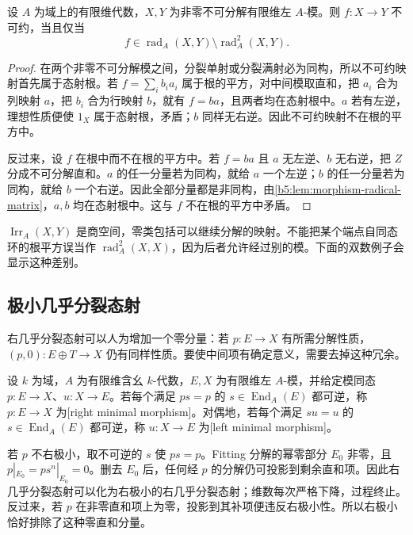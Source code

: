 \begin{proposition}\label{b5:prop:irreducible-radical}
	设 \(A\) 为域上的有限维代数，\(X,Y\) 为非零不可分解有限维左 \(A\)-模。则 \(f:X\to Y\) 不可约，当且仅当
	\[
		f\in\operatorname{rad}_A(X,Y)\setminus\operatorname{rad}_A^2(X,Y).
	\]
\end{proposition}
\begin{proof}
	在两个非零不可分解模之间，分裂单射或分裂满射必为同构，所以不可约映射首先属于态射根。若 \(f=\sum_i b_i a_i\) 属于根的平方，对中间模取直和，把 \(a_i\) 合为列映射 \(a\)，把 \(b_i\) 合为行映射 \(b\)，就有 \(f=ba\)，且两者均在态射根中。\(a\) 若有左逆，理想性质便使 \(1_X\) 属于态射根，矛盾；\(b\) 同样无右逆。因此不可约映射不在根的平方中。

	反过来，设 \(f\) 在根中而不在根的平方中。若 \(f=ba\) 且 \(a\) 无左逆、\(b\) 无右逆，把 \(Z\) 分成不可分解直和。\(a\) 的任一分量若为同构，就给 \(a\) 一个左逆；\(b\) 的任一分量若为同构，就给 \(b\) 一个右逆。因此全部分量都是非同构，由\cref{b5:lem:morphism-radical-matrix}，\(a,b\) 均在态射根中。这与 \(f\) 不在根的平方中矛盾。
\end{proof}

\(\operatorname{Irr}_A(X,Y)\) 是商空间，零类包括可以继续分解的映射。不能把某个端点自同态环的根平方误当作 \(\operatorname{rad}_A^2(X,X)\)，因为后者允许经过别的模。下面的双数例子会显示这种差别。

\subsection{极小几乎分裂态射}
\label{b5:subsec:1005:02}

右几乎分裂态射可以人为增加一个零分量：若 \(p:E\to X\) 有所需分解性质，\((p,0):E\oplus T\to X\) 仍有同样性质。要使中间项有确定意义，需要去掉这种冗余。

\begin{definition}\label{b5:def:minimal-morphism}
	设 \(k\) 为域，\(A\) 为有限维含幺 \(k\)-代数，\(E,X\) 为有限维左 \(A\)-模，并给定模同态 \(p:E\to X\)、\(u:X\to E\)。若每个满足 \(ps=p\) 的 \(s\in\operatorname{End}_A(E)\) 都可逆，称 \(p:E\to X\) 为[right minimal morphism]。对偶地，若每个满足 \(su=u\) 的 \(s\in\operatorname{End}_A(E)\) 都可逆，称 \(u:X\to E\) 为[left minimal morphism]。
\end{definition}

若 \(p\) 不右极小，取不可逆的 \(s\) 使 \(ps=p\)。Fitting 分解的幂零部分 \(E_0\) 非零，且 \(p|_{E_0}=ps^n|_{E_0}=0\)。删去 \(E_0\) 后，任何经 \(p\) 的分解仍可投影到剩余直和项。因此右几乎分裂态射可以化为右极小的右几乎分裂态射；维数每次严格下降，过程终止。反过来，若 \(p\) 在非零直和项上为零，投影到其补项便违反右极小性。所以右极小恰好排除了这种零直和分量。

